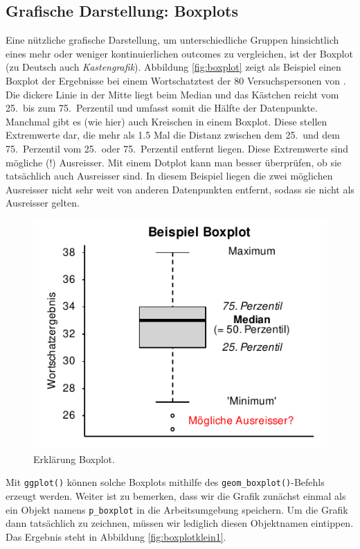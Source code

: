 \documentclass[oneside, 10pt]{book}\usepackage[]{graphicx}\usepackage[]{xcolor}
\newenvironment{knitrout}{}{} %
\begin{document}
\subsection{Grafische Darstellung: Boxplots}
Eine nützliche grafische Darstellung, um unterschiedliche
Gruppen hinsichtlich eines mehr oder weniger kontinuierlichen
outcomes zu vergleichen, ist der Boxplot
(zu Deutsch auch \textit{Kastengrafik}).
Abbildung \ref{fig:boxplot} zeigt als Beispiel
einen Boxplot der Ergebnisse bei einem Wortschatztest
der 80 Versuchspersonen von \citet{Vanhove2016}.
Die dickere Linie in der Mitte liegt beim Median
und das Kästchen reicht vom 25.\ bis zum 75.\ Perzentil
und umfasst somit die Hälfte der Datenpunkte.
Manchmal gibt es (wie hier) auch Kreischen in einem Boxplot.
Diese stellen Extremwerte dar, die mehr als 1.5 Mal
die Distanz zwischen dem 25.\ und dem 75.\ Perzentil
vom 25.\ oder 75.\ Perzentil entfernt liegen.
Diese Extremwerte sind mögliche (!) Ausreisser.
Mit einem Dotplot kann man besser überprüfen, ob sie tatsächlich
auch Ausreisser sind. In diesem Beispiel liegen die zwei
möglichen Ausreisser nicht sehr weit von anderen Datenpunkten
entfernt, sodass sie nicht als Ausreisser gelten.

\begin{knitrout}
\color{fgcolor}\begin{figure}[tp]

{\centering \includegraphics[width=.5\textwidth]{figs/unnamed-chunk-242-1} 

}

\caption{Erklärung Boxplot.\label{fig:boxplot}}\label{fig:unnamed-chunk-242}
\end{figure}

\end{knitrout}

Mit \texttt{ggplot()} können solche Boxplots mithilfe des
\texttt{geom\_boxplot()}-Befehls erzeugt werden.
Weiter ist zu bemerken, dass wir die Grafik zunächst einmal als ein Objekt
namens \texttt{p\_boxplot} in die Arbeitsumgebung speichern.
Um die Grafik dann tatsächlich zu zeichnen, müssen wir lediglich
diesen Objektnamen eintippen.
Das Ergebnis steht in Abbildung \ref{fig:boxplotklein1}.
\end{document}
